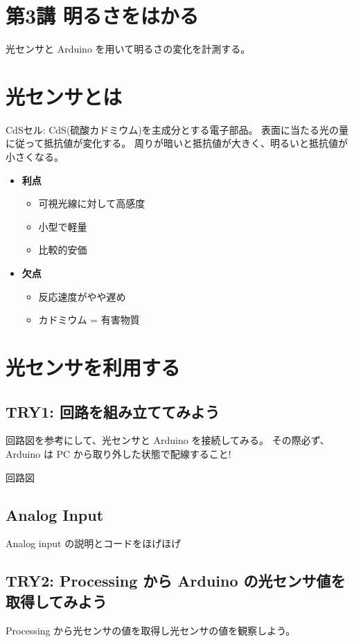 \documentclass[11pt,a4paper]{jarticle}
\begin{document}
\section*{\LARGE{第3講 明るさをはかる}}
光センサと Arduino を用いて明るさの変化を計測する。


\section{光センサとは}
CdSセル: CdS(硫酸カドミウム)を主成分とする電子部品。
表面に当たる光の量に従って抵抗値が変化する。
周りが暗いと抵抗値が大きく、明るいと抵抗値が小さくなる。

\begin{itemize}
 \item \textbf{利点}
       \begin{itemize}
	\item 可視光線に対して高感度
	\item 小型で軽量
	\item 比較的安価
       \end{itemize}
 \item \textbf{欠点}
       \begin{itemize}
	\item 反応速度がやや遅め
	\item カドミウム = 有害物質
       \end{itemize}
\end{itemize}


\section{光センサを利用する}

\subsection*{TRY1: 回路を組み立ててみよう}
回路図を参考にして、光センサと Arduino を接続してみる。
その際必ず、Arduino は PC から取り外した状態で配線すること!

回路図

\subsection*{Analog Input}
Analog input の説明とコードをほげほげ


\subsection*{TRY2: Processing から Arduino の光センサ値を取得してみよう}
Processing から光センサの値を取得し光センサの値を観察しよう。
\end{document}
